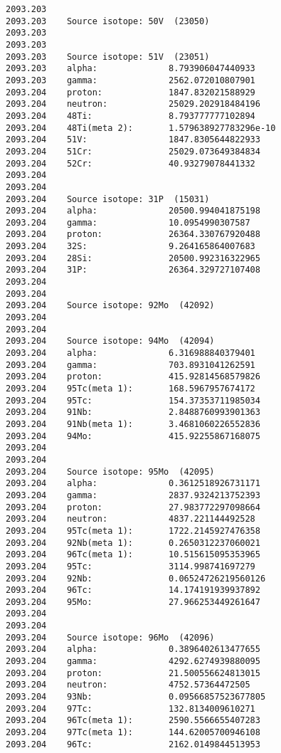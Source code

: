 \begin{lstlisting}[style=sOutputFile,caption={Final results for steel irradiation},label={listing:alexsteel}]
2093.203    
2093.203    Source isotope: 50V  (23050)
2093.203    
2093.203    
2093.203    Source isotope: 51V  (23051)
2093.203    alpha:              8.793906047440933
2093.203    gamma:              2562.072010807901
2093.204    proton:             1847.832021588929
2093.204    neutron:            25029.202918484196
2093.204    48Ti:               8.793777777102894
2093.204    48Ti(meta 2):       1.579638927783296e-10
2093.204    51V:                1847.8305644822933
2093.204    51Cr:               25029.073649384834
2093.204    52Cr:               40.93279078441332
2093.204    
2093.204    
2093.204    Source isotope: 31P  (15031)
2093.204    alpha:              20500.994041875198
2093.204    gamma:              10.0954990307587
2093.204    proton:             26364.330767920488
2093.204    32S:                9.264165864007683
2093.204    28Si:               20500.992316322965
2093.204    31P:                26364.329727107408
2093.204    
2093.204    
2093.204    Source isotope: 92Mo  (42092)
2093.204    
2093.204    
2093.204    Source isotope: 94Mo  (42094)
2093.204    alpha:              6.316988840379401
2093.204    gamma:              703.8931041262591
2093.204    proton:             415.92814568579826
2093.204    95Tc(meta 1):       168.5967957674172
2093.204    95Tc:               154.37353711985034
2093.204    91Nb:               2.8488760993901363
2093.204    91Nb(meta 1):       3.4681060226552836
2093.204    94Mo:               415.92255867168075
2093.204    
2093.204    
2093.204    Source isotope: 95Mo  (42095)
2093.204    alpha:              0.3612518926731171
2093.204    gamma:              2837.9324213752393
2093.204    proton:             27.983772297098664
2093.204    neutron:            4837.221144492528
2093.204    95Tc(meta 1):       1722.2145927476358
2093.204    92Nb(meta 1):       0.2650312237060021
2093.204    96Tc(meta 1):       10.515615095353965
2093.204    95Tc:               3114.998741697279
2093.204    92Nb:               0.06524726219560126
2093.204    96Tc:               14.174191939937892
2093.204    95Mo:               27.966253449261647
2093.204    
2093.204    
2093.204    Source isotope: 96Mo  (42096)
2093.204    alpha:              0.3896402613477655
2093.204    gamma:              4292.6274939880095
2093.204    proton:             21.500556624813015
2093.204    neutron:            4752.57364472505
2093.204    93Nb:               0.09566857523677805
2093.204    97Tc:               132.8134009610271
2093.204    96Tc(meta 1):       2590.5566655407283
2093.204    97Tc(meta 1):       144.62005700946108
2093.204    96Tc:               2162.0149844513953

\end{lstlisting}
